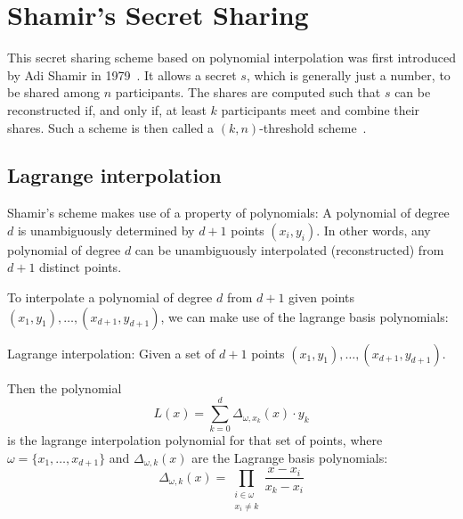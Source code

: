 

\section{Shamir's Secret Sharing}
This secret sharing scheme based on polynomial interpolation was first introduced by Adi Shamir in 1979~\cite{shamir_how_1979}.
It allows a secret $s$, which is generally just a number, to be shared among $n$ participants.
The shares are computed such that $s$ can be reconstructed if, and only if, at least $k$ participants meet and combine their shares.
Such a scheme is then called a $(k,n)$-threshold scheme~\cite{shamir_how_1979}.

\subsection{Lagrange interpolation}
Shamir's scheme makes use of a property of polynomials: A polynomial of degree $d$ is unambiguously determined by $d+1$ points $(x_i, y_i)$.
In other words, any polynomial of degree $d$ can be unambiguously interpolated (reconstructed) from $d+1$ distinct points.

To interpolate a polynomial of degree $d$ from $d+1$ given points $(x_1, y_1), \dots, (x_{d+1}, y_{d+1})$, we can make use of the lagrange basis polynomials:~\cite{yao_lightweight_2015}

\begin{definition}
    Lagrange interpolation: Given a set of $d+1$ points $(x_1, y_1), \dots, (x_{d+1}, y_{d+1})$.

    Then the polynomial 
    \begin{equation}
        L(x) = \sum_{k=0}^d \Delta_{\omega, x_k}(x) \cdot y_k
    \end{equation}
    is the lagrange interpolation polynomial for that set of points, where $\omega = \{x_1, \dots, x_{d+1}\}$ and $\Delta_{\omega,k}(x)$ are the Lagrange basis polynomials:
    \begin{equation}
        \Delta_{\omega,k}(x) = \prod_{\substack{i\in\omega\\ x_i \neq k}} \frac{x-x_i}{x_k-x_i}
    \end{equation}
\end{definition}

